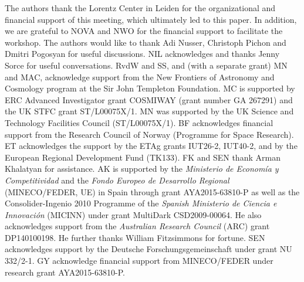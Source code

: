 \documentclass[useAMS,usenatbib]{mnras}
\begin{document}
 

The authors thank the Lorentz Center in Leiden for the organizational and financial support of this meeting, which ultimately led to this 
paper. In addition, we are grateful to NOVA and NWO for the financial support to facilitate the workshop. The authors would like to thank Adi Nusser, Christoph Pichon and Dmitri Pogosyan for useful discussions. NIL acknowledges and thanks Jenny Sorce for useful conversations. RvdW and SS, and (with a separate grant) MN and MAC, acknowledge support from the New Frontiers of Astronomy and Cosmology program at the Sir John Templeton Foundation. MC is supported by ERC Advanced Investigator grant COSMIWAY (grant number GA 267291) and the UK STFC grant ST/L00075X/1. MN was supported by the UK Science and Technology Facilities Council (ST/L00075X/1). BF acknowledges financial support from the Research 
Council of Norway (Programme for Space Research). ET acknowledges the support by the ETAg grants IUT26-2, IUT40-2, and by the European 
Regional Development Fund (TK133). FK and SEN thank Arman Khalatyan for assistance. 
AK is supported by the {\it Ministerio de Econom\'ia y Competitividad} and the {\it Fondo Europeo de Desarrollo Regional} (MINECO/FEDER, UE) in Spain through grant AYA2015-63810-P as well as the Consolider-Ingenio 2010 Programme of the {\it Spanish Ministerio de Ciencia e Innovaci\'on} (MICINN) under grant MultiDark CSD2009-00064. He also acknowledges support from the {\it Australian Research Council} (ARC) grant DP140100198. He further thanks William Fitzsimmons for fortune. SEN acknowledges support by the Deutsche Forschungsgemeinschaft under grant NU 332/2-1. GY acknowledge  financial support from MINECO/FEDER under research grant AYA2015-63810-P.


\end{document}
